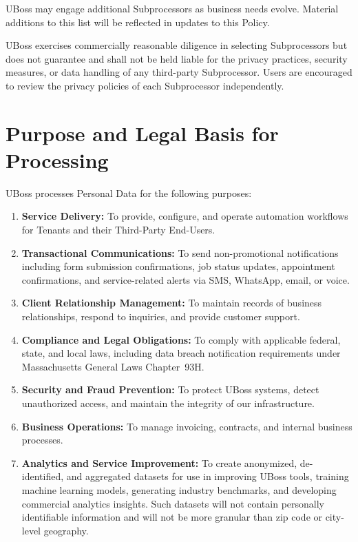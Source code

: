 \documentclass[11pt, letterpaper]{article}
\begin{document}
UBoss may engage additional Subprocessors as business needs evolve. Material additions
to this list will be reflected in updates to this Policy.

UBoss exercises commercially reasonable diligence in selecting Subprocessors but does
not guarantee and shall not be held liable for the privacy practices, security measures,
or data handling of any third-party Subprocessor. Users are encouraged to review the
privacy policies of each Subprocessor independently.

\section{Purpose and Legal Basis for Processing}

UBoss processes Personal Data for the following purposes:

\begin{enumerate}
    \item \textbf{Service Delivery:} To provide, configure, and operate automation
          workflows for Tenants and their Third-Party End-Users.

    \item \textbf{Transactional Communications:} To send non-promotional notifications
          including form submission confirmations, job status updates, appointment
          confirmations, and service-related alerts via SMS, WhatsApp, email, or voice.

    \item \textbf{Client Relationship Management:} To maintain records of business
          relationships, respond to inquiries, and provide customer support.

    \item \textbf{Compliance and Legal Obligations:} To comply with applicable federal,
          state, and local laws, including data breach notification requirements under
          Massachusetts General Laws Chapter~93H.

    \item \textbf{Security and Fraud Prevention:} To protect UBoss systems, detect
          unauthorized access, and maintain the integrity of our infrastructure.

    \item \textbf{Business Operations:} To manage invoicing, contracts, and internal
          business processes.

    \item \textbf{Analytics and Service Improvement:} To create anonymized,
          de-identified, and aggregated datasets for use in improving UBoss tools,
          training machine learning models, generating industry benchmarks, and
          developing commercial analytics insights. Such datasets will not contain
          personally identifiable information and will not be more granular than zip
          code or city-level geography.
\end{enumerate}
\end{document}
